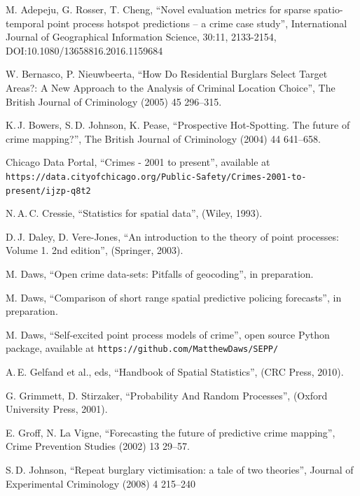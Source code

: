 \documentclass[twoside,a4paper]{article}
\theoremstyle{plain}
\theoremstyle{definition}
\begin{document}
\begin{thebibliography}{99}

 M. Adepeju, G. Rosser, T. Cheng,
	``Novel evaluation metrics for sparse spatio-temporal point process hotspot predictions -- a crime case study'', International Journal of Geographical Information Science, 30:11, 2133-2154, DOI:10.1080/13658816.2016.1159684

 W. Bernasco, P. Nieuwbeerta,
	``How Do Residential Burglars Select Target Areas?: A New Approach to the Analysis of Criminal Location Choice'',
	The British Journal of Criminology (2005) 45 296--315.

 K.\,J. Bowers, S.\,D. Johnson, K. Pease,
	``Prospective Hot-Spotting.  The future of crime mapping?'',
	The British Journal of Criminology (2004) 44 641--658.

 Chicago Data Portal, ``Crimes - 2001 to present'', available at
   \texttt{https://data.cityofchicago.org/Public-Safety/Crimes-2001-to-present/ijzp-q8t2}

 N.\,A.\,C. Cressie,
	``Statistics for spatial data'',
	(Wiley, 1993).

 D.\,J. Daley, D. Vere-Jones,
	``An introduction to the theory of point processes: Volume 1. 2nd edition'',
	(Springer, 2003).

 M. Daws, ``Open crime data-sets: Pitfalls of geocoding'',
	in preparation.

 M. Daws, ``Comparison of short range spatial predictive policing forecasts'',
	in preparation.

 M. Daws, ``Self-excited point process models of crime'',
    open source Python package, available at \texttt{https://github.com/MatthewDaws/SEPP/}


 A.\,E. Gelfand et al., eds,
	``Handbook of Spatial Statistics'',
	(CRC Press, 2010).

 G. Grimmett, D. Stirzaker, ``Probability And Random Processes'',
     (Oxford University Press, 2001).

 E. Groff, N. La Vigne,
	``Forecasting the future of predictive crime mapping'',
    Crime Prevention Studies (2002) 13 29--57.

 S.\,D. Johnson,
	``Repeat burglary victimisation: a tale of two theories'',
	Journal of Experimental Criminology (2008) 4 215--240
	

\end{thebibliography}
\end{document}
